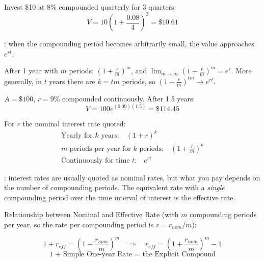 \begin{example}
    Invest \$10 at 8\% compounded quarterly for 3 quarters:
    \[V = 10\left(1+\frac{0.08}{4}\right)^3 = \$10.61\]
\end{example}

\begin{definition}
    : when the compounding period becomes arbitrarily small, the value approaches $e^{rt}$.
\end{definition}
After 1 year with $m$ periods: $(1+\frac{r}{m})^m$, and $\lim_{m\to\infty}(1+\frac{r}{m})^m = e^r$. More generally, in $t$ years there are $k = tm$ periods, so $(1+\frac{r}{m})^{tm} \to e^{rt}$.

\begin{example}
    $A = \$100$, $r = 9\%$ compounded continuously. After 1.5 years:
    \[V = 100e^{(0.09)(1.5)} = \$114.45\]
\end{example}

For $r$ the nominal interest rate quoted:
\[\boxed{\begin{gathered}
    \text{Yearly for $k$ years:} \quad (1+r)^k\\
    \text{$m$ periods per year for $k$ periods:} \quad \left(1+\frac{r}{m}\right)^k\\
    \text{Continuously for time $t$:} \quad e^{rt}
\end{gathered}}\]

\begin{definition}
    : interest rates are usually quoted as nominal rates, but what you pay depends on the number of compounding periods. The equivalent rate with a \textit{single} compounding period over the time interval of interest is the effective rate.
\end{definition}

Relationship between Nominal and Effective Rate (with $m$ compounding periods per year, so the rate per compounding period is $r = r_{nom}/m$):

\begin{center}
\end{center}
\[1+ r_{eff} = (1+ \frac{r_{nom}}{m})^m \quad \Rightarrow \quad \boxed{r_{eff} = (1+ \frac{r_{nom}}{m})^m - 1}\]
\[\text{1 + Simple One-year Rate = the Explicit Compound}\]

